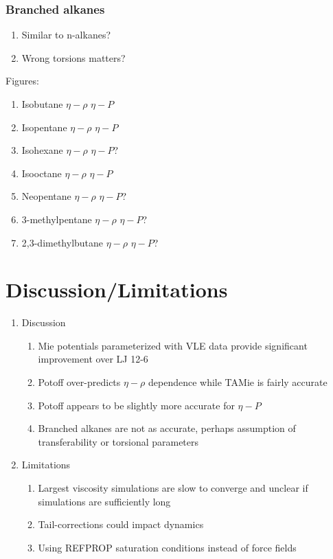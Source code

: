 \documentclass[11pt,a4paper]{article}
\begin{document}
\subsubsection{Branched alkanes}

\begin{enumerate}
	\item Similar to n-alkanes? 
	\item Wrong torsions matters?
\end{enumerate}

Figures:

\begin{enumerate}
	\item Isobutane $\eta-\rho$ $\eta-P$
	\item Isopentane $\eta-\rho$ $\eta-P$
	\item Isohexane $\eta-\rho$ $\eta-P$?
	\item Isooctane $\eta-\rho$ $\eta-P$
	\item Neopentane $\eta-\rho$ $\eta-P$?
	\item 3-methylpentane $\eta-\rho$ $\eta-P$?
	\item 2,3-dimethylbutane $\eta-\rho$ $\eta-P$?
\end{enumerate}

\section{Discussion/Limitations}

\begin{enumerate}
	\item Discussion
	\begin{enumerate}
		\item Mie potentials parameterized with VLE data provide significant improvement over LJ 12-6
		\item Potoff over-predicts $\eta-\rho$ dependence while TAMie is fairly accurate
		\item Potoff appears to be slightly more accurate for $\eta-P$
		\item Branched alkanes are not as accurate, perhaps assumption of transferability or torsional parameters
	\end{enumerate}
    \item Limitations
    \begin{enumerate}
    	\item Largest viscosity simulations are slow to converge and unclear if simulations are sufficiently long
    	\item Tail-corrections could impact dynamics
    	\item Using REFPROP saturation conditions instead of force fields
    \end{enumerate}
\end{enumerate}
\end{document}
